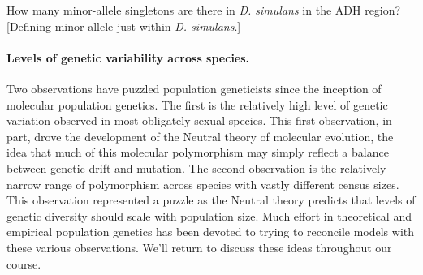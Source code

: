\begin{question}{}
How many minor-allele singletons are there in \textit{D. simulans} in
the ADH region? [Defining minor allele just within \textit{D. simulans}.]
 \end{question}

\paragraph{Levels of genetic variability across species.}
Two observations have puzzled population geneticists since the
inception of molecular population genetics. The first is the relatively high
level of genetic variation observed in most obligately sexual species.
This first observation, in part, drove the development of the Neutral
theory of molecular evolution, the idea that much of this molecular
polymorphism may simply reflect a balance between genetic drift and
mutation.
The second observation is the relatively narrow range of
polymorphism across species with vastly different census sizes. This
observation represented a puzzle as the Neutral theory predicts that
levels of genetic diversity should scale with population size. Much effort
in theoretical and empirical population genetics has been devoted to
trying to reconcile models with these various observations. We'll
return to discuss these ideas throughout our course.

